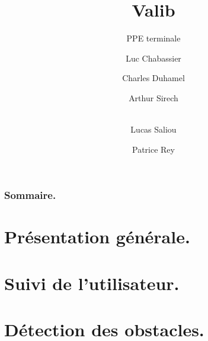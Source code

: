 \documentclass{beamer}
\title{Valib}
\subtitle{PPE terminale}
\author[Luc \and Charles \and Arthur \and Lucas \and Patrice]{Luc Chabassier \and Charles Duhamel \and Arthur Sirech \and\\ Lucas Saliou \and Patrice Rey}
\institute{Lycée Pierre de Fermat}
\begin{document}
\begin{frame}
	\maketitle
\end{frame}

\begin{frame}
	\frametitle{Sommaire.}
	\tableofcontents
\end{frame}

\section{Présentation générale.}


\section[Suivi]{Suivi de l'utilisateur.}


\section[Obstacles]{Détection des obstacles.}

\end{document}

